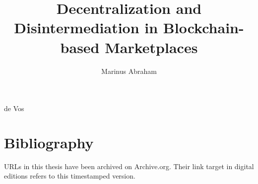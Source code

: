 \documentclass{dissertation}
\begin{document}
\title{Decentralization and Disintermediation in Blockchain-based Marketplaces}
\author{Marinus Abraham}{de Vos}

\frontmatter




\tableofcontents




\mainmatter

\thumbtrue








%
%




%

\thumbfalse

\chapter*{Bibliography}

URLs in this thesis have been archived on Archive.org. Their link target in digital editions refers
to this timestamped version.





\glsaddall
\printglossary[type=\acronymtype,title={Glossary}]



%
\end{document}
